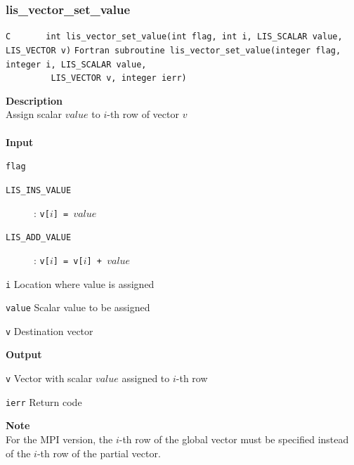 \documentclass[a4paper]{article}
\newcommand{\namelistlabel}[1]{\mbox{#1}\hfill}
\newenvironment{namelist}[1]{%
 \begin{list}{}
  {\let\makelabel\namelistlabel
  \settowidth{\labelwidth}{#1}
  \setlength{\leftmargin}{1.1\labelwidth}}
}{%
\end{list}}
\begin{document}
  \subsubsection{lis\_vector\_set\_value}
\begin{screen}
\verb|C       int lis_vector_set_value(int flag, int i, LIS_SCALAR value, LIS_VECTOR v)|
\verb|Fortran subroutine lis_vector_set_value(integer flag, integer i, LIS_SCALAR value,|\\
\verb|         LIS_VECTOR v, integer ierr)|
\end{screen}
{\bf Description}\\
\indent
Assign scalar $value$ to $i$-th row of vector $v$
\\ \\
\noindent
{\bf Input}
\begin{namelist}{XXXXXXXXXXXXXXXXXXXX}
\item[\tt flag] \begin{description}
\item[\tt LIS\_INS\_VALUE]: {\tt v[$i$] = $value$}
\item[\tt LIS\_ADD\_VALUE]: {\tt v[$i$] = v[$i$] + $value$}
\end{description}
\item[\tt i] Location where value is assigned
\item[\tt value] Scalar value to be assigned
\item[\tt v] Destination vector
\end{namelist}
{\bf Output}
\begin{namelist}{XXXXXXXXXXXXXXXXXXXX}
\item[\tt v] Vector with scalar $value$ assigned to $i$-th row
\item[\tt ierr] Return code
\end{namelist}
{\bf Note}\\
\indent
For the MPI version, the $i$-th row of the global vector must be specified instead 
of the $i$-th row of the partial vector.
\end{document}
